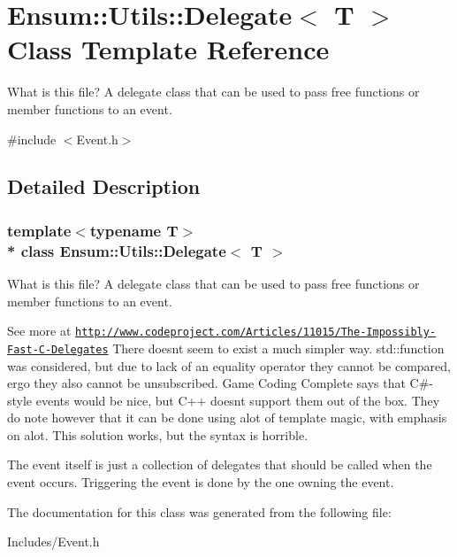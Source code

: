 \hypertarget{class_ensum_1_1_utils_1_1_delegate}{}\section{Ensum\+:\+:Utils\+:\+:Delegate$<$ T $>$ Class Template Reference}
\label{class_ensum_1_1_utils_1_1_delegate}


What is this file? A delegate class that can be used to pass free functions or member functions to an event.  




{\ttfamily \#include $<$Event.\+h$>$}



\subsection{Detailed Description}
\subsubsection*{template$<$typename T$>$\\*
class Ensum\+::\+Utils\+::\+Delegate$<$ T $>$}

What is this file? A delegate class that can be used to pass free functions or member functions to an event. 

See more at \href{http://www.codeproject.com/Articles/11015/The-Impossibly-Fast-C-Delegates}{\tt http\+://www.\+codeproject.\+com/\+Articles/11015/\+The-\/\+Impossibly-\/\+Fast-\/\+C-\/\+Delegates} There doesn\textquotesingle{}t seem to exist a much simpler way. std\+::function was considered, but due to lack of an equality operator they cannot be compared, ergo they also cannot be unsubscribed. Game Coding Complete says that C\#-\/style events would be nice, but C++ doesn\textquotesingle{}t support them out of the box. They do note however that it can be done using alot of template magic, with emphasis on alot. This solution works, but the syntax is horrible.

The event itself is just a collection of delegates that should be called when the event occurs. Triggering the event is done by the one owning the event. 

The documentation for this class was generated from the following file\+:\begin{DoxyCompactItemize}
\item 
Includes/Event.\+h\end{DoxyCompactItemize}

